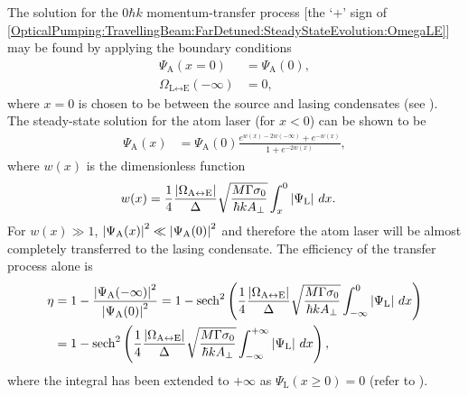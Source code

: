 The solution for the $0 \hbar k$ momentum-transfer process [the `$+$' sign of \eqref{OpticalPumping:TravellingBeam:FarDetuned:SteadyStateEvolution:OmegaLE}] may be found by applying the boundary conditions
\begin{subequations}
    \begin{align}
        \Psi_\text{A}(x=0) &= \Psi_\text{A}(0), \\
        \Omega_{\text{L} \leftrightarrow \text{E}}(-\infty) &= 0,
    \end{align}
\end{subequations}
where $x=0$ is chosen to be between the source and lasing condensates (see ).  The steady-state solution for the atom laser (for $x < 0$) can be shown to be
\begin{align}
    \Psi_\text{A}(x) &= \Psi_\text{A}(0) \frac{e^{w(x) - 2 w(-\infty)} + e^{-w(x)}}{1 + e^{-2 w(x)}},
\end{align}
where $w(x)$ is the dimensionless function
\begin{align}
    w(x) &= \frac{1}{4} \frac{\left|\Omega_{\text{A} \leftrightarrow \text{E}}\right|}{\Delta} \sqrt{ \frac{M \Gamma \sigma_0}{\hbar k A_\perp}} \int_{x}^{0} \left|\Psi_\text{L}\right|\, dx.
\end{align}
For $w(x) \gg 1$, $\left|\Psi_\text{A}(x)\right|^2 \ll \left|\Psi_\text{A}(0)\right|^2$ and therefore the atom laser will be almost completely transferred to the lasing condensate.  The efficiency of the transfer process alone is
\begin{align}
    \eta &= 1 - \frac{\left|\Psi_\text{A}(-\infty)\right|^2}{\left|\Psi_\text{A}(0)\right|^2} = 1-\operatorname{sech}^2\left(\frac{1}{4} \frac{\left|\Omega_{\text{A} \leftrightarrow \text{E}}\right|}{\Delta} \sqrt{\frac{M \Gamma \sigma_0}{\hbar k A_\perp}} \int_{-\infty}^{0} \left|\Psi_\text{L}\right|\, dx \right) \notag \\
    &= 1-\operatorname{sech}^2\left(\frac{1}{4} \frac{\left|\Omega_{\text{A} \leftrightarrow \text{E}}\right|}{\Delta} \sqrt{\frac{M \Gamma \sigma_0}{\hbar k A_\perp}} \int_{-\infty}^{+\infty} \left|\Psi_\text{L}\right|\, dx \right),
\end{align}
where the integral has been extended to $+\infty$ as $\Psi_\text{L}(x\geq 0) = 0$ (refer to ).

